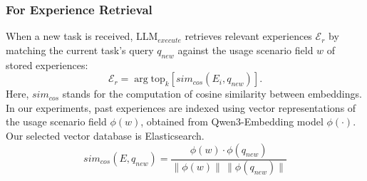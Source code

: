 \documentclass[11pt]{article}
\begin{document}
\begin{table}[tbp]
    \centering
    \caption{Ablation study of retrieve keys.}\label{tab:key}
\end{table}

\subsubsection{For Experience Retrieval}\label{app:retrieval}
When a new task is received, $\text{LLM}_{execute}$ retrieves relevant experiences $\mathcal{E}_{r}$ by matching the current task’s query $q_{new}$ against the usage scenario field $w$ of stored experiences:
\begin{equation}
    \mathcal{E}_{r} = \arg{\text{top}_k} \left[sim_{cos}(E_i, q_{new})\right].
\end{equation}
Here, $sim_{cos}$ stands for the computation of cosine similarity between embeddings. 
In our experiments, past experiences are indexed using vector representations of the usage scenario field $\phi(w)$, obtained from Qwen3-Embedding model $\phi(\cdot)$.
Our selected vector database is Elasticsearch.
\begin{equation}
    sim_{cos}(E, q_{new})= \frac{\phi(w)\cdot \phi(q_{new}) }{\|\phi(w)\| \, \|\phi(q_{new})\|}
\end{equation}
\end{document}
